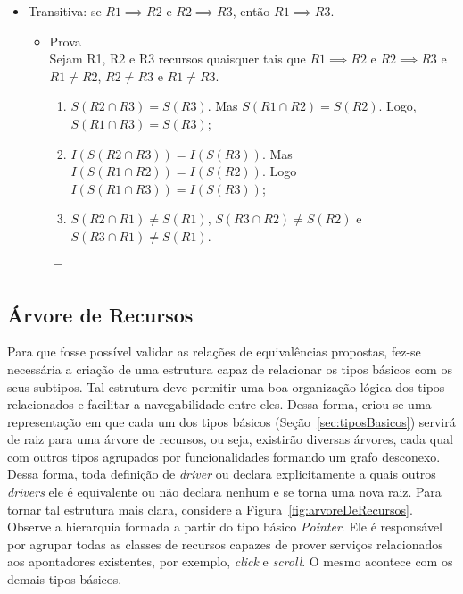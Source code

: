 \begin{itemize}
	\item Transitiva: se $R1 \implies R2$ e $R2 \implies R3$, então $R1 \implies R3$.

	\begin{itemize}
		\item Prova \\

		Sejam R1, R2 e R3 recursos quaisquer tais que $R1 \implies R2$ e $R2 \implies R3$ e $R1 \neq R2$, $R2 \neq R3$ e $R1 \neq R3$. \\

		\begin{enumerate}
			
			\item $S(R2 \cap R3) = S(R3)$. Mas $S(R1 \cap R2) = S(R2)$. Logo, $S(R1 \cap R3) = S(R3)$; \\
			\item $I(S(R2 \cap R3)) = I(S(R3))$. Mas $I(S(R1 \cap R2)) = I(S(R2))$. Logo $I(S(R1 \cap R3)) = I(S(R3))$; \\
			\item $S(R2 \cap R1) \neq S(R1)$, $S(R3 \cap R2) \neq S(R2)$ e $S(R3 \cap R1) \neq S(R1)$.
		\end{enumerate}
		\begin{flushright}$\Box$\end{flushright}
	\end{itemize}	
\end{itemize}

\subsection{Árvore de Recursos}
\label{subsec:arvoreDeRecursos}

Para que fosse possível validar as relações de equivalências propostas, fez-se necessária a criação de uma estrutura capaz de relacionar os tipos básicos com os seus subtipos. Tal estrutura deve permitir uma boa organização lógica dos tipos relacionados e facilitar a navegabilidade entre eles. Dessa forma, criou-se uma representação em que cada um dos tipos básicos (Seção~\ref{sec:tiposBasicos}) servirá de raiz para uma árvore de recursos, ou seja, existirão diversas árvores, cada qual com outros tipos agrupados por funcionalidades formando um grafo desconexo. Dessa forma, toda definição de \emph{driver} ou declara explicitamente a quais outros \emph{drivers} ele é equivalente ou não declara nenhum e se torna uma nova raiz. Para tornar tal estrutura mais clara, considere a Figura~\ref{fig:arvoreDeRecursos}. Observe a hierarquia formada a partir do tipo básico \emph{Pointer}. Ele é responsável por agrupar todas as classes de recursos capazes de prover serviços relacionados aos apontadores existentes, por exemplo, \emph{click} e \emph{scroll}. O mesmo acontece com os demais tipos básicos.

